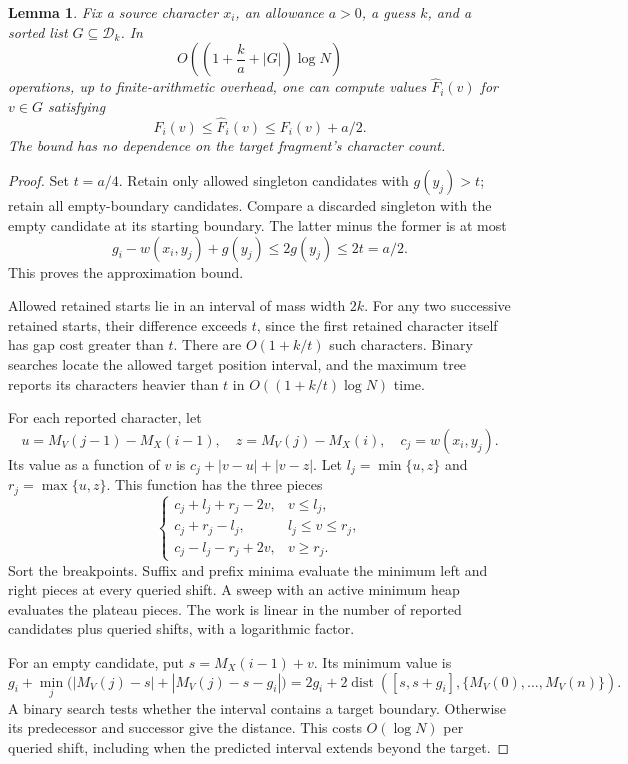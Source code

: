 \documentclass[11pt]{article}
\newtheorem{lemma}[theorem]{Lemma}
\theoremstyle{definition}
\newcommand{\1}{\mathbf 1}
\begin{document}
\begin{lemma}\label{seed:lem:leaf}
Fix a source character $x_i$, an allowance $a>0$, a guess $k$, and a
sorted list $G\subseteq\mathcal D_k$. In
\[
 O\left(\left(1+\frac{k}{a}+|G|\right)\log N\right)
\]
operations, up to finite-arithmetic overhead, one can compute values
$\widehat F_i(v)$ for $v\in G$ satisfying
\[
 F_i(v)\le\widehat F_i(v)\le F_i(v)+a/2.
\]
The bound has no dependence on the target fragment's character count.
\end{lemma}
\begin{proof}
Set $t=a/4$. Retain only allowed singleton candidates with $g(y_j)>t$;
retain all empty-boundary candidates. Compare a discarded singleton with
the empty candidate at its starting boundary. The latter minus the former
is at most
\[
 g_i-w(x_i,y_j)+g(y_j)\le2g(y_j)\le2t=a/2.
\]
This proves the approximation bound.

Allowed retained starts lie in an interval of mass width $2k$. For any two
successive retained starts, their difference exceeds $t$, since the first
retained character itself has gap cost greater than $t$. There are
$O(1+k/t)$ such characters. Binary searches locate the allowed target
position interval, and the maximum tree reports its characters heavier
than $t$ in $O((1+k/t)\log N)$ time.

For each reported character, let
\[
 u=M_V(j-1)-M_X(i-1),\quad z=M_V(j)-M_X(i),\quad c_j=w(x_i,y_j).
\]
Its value as a function of $v$ is $c_j+|v-u|+|v-z|$. Let
$l_j=\min\{u,z\}$ and $r_j=\max\{u,z\}$. This function has the three
pieces
\[
 \begin{cases}
 c_j+l_j+r_j-2v,&v\le l_j,\\
 c_j+r_j-l_j,&l_j\le v\le r_j,\\
 c_j-l_j-r_j+2v,&v\ge r_j.
 \end{cases}
\]
Sort the breakpoints. Suffix and prefix minima evaluate the minimum left
and right pieces at every queried shift. A sweep with an active minimum
heap evaluates the plateau pieces. The work is linear in the number of
reported candidates plus queried shifts, with a logarithmic factor.

For an empty candidate, put $s=M_X(i-1)+v$. Its minimum value is
\[
 g_i+\min_j\bigl(|M_V(j)-s|+|M_V(j)-s-g_i|\bigr)
 =2g_i+2\operatorname{dist}([s,s+g_i],\{M_V(0),\dots,M_V(n)\}).
\]
A binary search tests whether the interval contains a target boundary.
Otherwise its predecessor and successor give the distance. This costs
$O(\log N)$ per queried shift, including when the predicted interval
extends beyond the target.
\end{proof}
\end{document}
